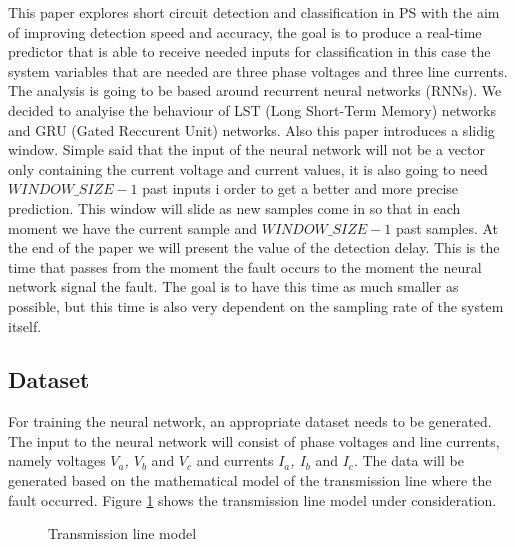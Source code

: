 \documentclass[11pt]{IEEEtran}
\begin{document}
This paper explores short circuit detection and classification in PS with the aim of improving detection speed and accuracy, the goal is to produce a real-time predictor that is able to receive needed inputs for classification in this case the system variables that are needed are three phase voltages and three line currents. The analysis is going to be based around recurrent neural networks (RNNs). 
We decided to analyise the behaviour of LST (Long Short-Term Memory) networks and GRU (Gated Reccurent Unit) networks. Also this paper introduces a slidig window. Simple said that the input of the neural network will not be a vector only containing the current voltage and current values, it is also going to need $WINDOW\_SIZE - 1$ past inputs i order to get a better and more precise prediction. This window will slide as new samples come in so that in each moment we have the current sample and $WINDOW\_SIZE - 1$ past samples. 
At the end of the paper we will present the value of the detection delay. This is the time that passes from the moment the fault occurs to the moment the neural network signal the fault. The goal is to have this time as much smaller as possible, but this time is also very dependent on the sampling rate of the system itself.

\subsection{Dataset}
For training the neural network, an appropriate dataset needs to be generated. The input to the neural network will consist of phase voltages and line currents, namely voltages \textit{$V_a$, $V_b$} and \textit{$V_c$} and currents \textit{$I_a$, $I_b$} and \textit{$I_c$}. The data will be generated based on the mathematical model of the transmission line where the fault occurred. Figure \ref{fig:transmission_line} shows the transmission line model under consideration.

\begin{figure}[t]  %
    \centering
    \caption{Transmission line model}
    \label{fig:transmission_line}  %
\end{figure}
\end{document}
